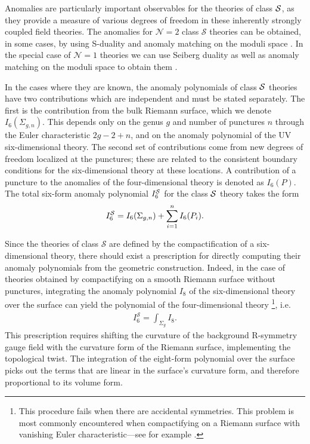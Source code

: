 \documentclass[a4paper,11pt]{article}
\newcommand{\ba}[1]{\begin{align} #1 \end{align} }
\def\CS{{\cal S}}
\begin{document}
Anomalies are particularly important observables for the theories of class $\CS$, as they provide a measure of various degrees of freedom in these inherently strongly coupled field theories. The anomalies for $\mathcal{N}=2$ class $\mathcal{S}$ theories can be obtained, in some cases, by using S-duality \cite{Gaiotto:2009we,Gaiotto:2009gz,Chacaltana:2010ks} and anomaly matching on the moduli space \cite{Chacaltana:2012zy,Tachikawa:2015bga}. In the special case of $\mathcal{N}=1$ theories we can use Seiberg duality as well as anomaly matching on the moduli space to obtain them \cite{Gadde:2013fma,Bah:2013aha,Agarwal:2014rua}.  

In the cases where they are known, the anomaly polynomials of class $\CS$ theories have two contributions which are independent and must be stated separately. The first is the contribution from the bulk Riemann surface, which we denote $I_6(\Sigma_{g,n})$. This depends only on the genus $g$ and number of punctures $n$ through the Euler characteristic $2g-2+n$, and on the anomaly polynomial of the UV six-dimensional theory. The second set of contributions come from new degrees of freedom localized at the punctures; these are related to the consistent boundary conditions for the six-dimensional theory at these locations.  A contribution of a puncture to the anomalies of the four-dimensional theory is denoted as $I_6(P)$. The total six-form anomaly polynomial $I_6^{\CS}$ for the class $\CS$ theory takes the form
	\ba{
I_6^{\CS}=I_6(\Sigma_{g,n}) + \sum_{i=1}^n I_6(P_i).\label{eq:cs1}
	}
	
Since the theories of class $\mathcal{S}$ are defined by the compactification of a six-dimensional theory, there should exist a prescription for directly computing their anomaly polynomials from the geometric construction.  Indeed, in the case of theories obtained by compactifying on a smooth Riemann surface without punctures, integrating the anomaly polynomial $I_8$ of the six-dimensional theory over the surface can yield the polynomial of the four-dimensional theory \cite{Alday:2009qq,Bah:2012dg}\footnote{This procedure fails when there are accidental symmetries.  This problem is most commonly encountered when compactifying on a Riemann surface with vanishing Euler characteristic---see for example \cite{Bah:2017gph}.}, i.e. 
	\ba{
		I_6^{\mathcal{S}} = \int_{\Sigma_{g}}I_8.\label{eq:integrate1}
	}
	This prescription requires shifting the curvature of the background R-symmetry gauge field with the curvature form of the Riemann surface, implementing the topological twist.  The integration of the eight-form polynomial over the surface picks out the terms that are linear in the surface's curvature form, and therefore proportional to its volume form.  
	
\end{document}
